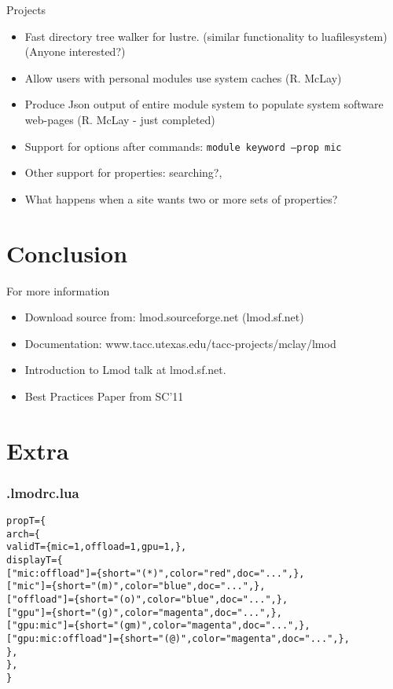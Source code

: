 \documentclass{beamer}
\begin{document}
\begin{frame}{Projects}
  \begin{itemize}
    \item Fast directory tree walker for lustre. (similar
      functionality to luafilesystem) (Anyone interested?)
    \item Allow users with personal modules use system caches (R. McLay)
    \item Produce Json output of entire module system to populate
      system software web-pages (R. McLay - just completed)
    \item Support for options after commands:  \texttt{module keyword --prop mic}
    \item Other support for properties: searching?,
    \item What happens when a site wants two or more sets of properties?
  \end{itemize}
\end{frame}





\section{Conclusion}

\begin{frame}{For more information}
  \begin{itemize}
    \item Download source from: lmod.sourceforge.net (lmod.sf.net)
    \item Documentation: www.tacc.utexas.edu/tacc-projects/mclay/lmod
    \item Introduction to Lmod talk at lmod.sf.net.
    \item Best Practices Paper from SC'11
  \end{itemize}
\end{frame}

\section{Extra}


\begin{frame}[fragile]
    \frametitle{.lmodrc.lua}
  {\tiny
    \begin{alltt}
propT = \{
   arch = \{
      validT = \{ mic = 1, offload = 1, gpu = 1, \},
      displayT = \{
         ["mic:offload"]     = \{ short = "(*)",  color = "red",     doc = "...",\},
         ["mic"]             = \{ short = "(m)",  color = "blue",    doc = "...",\},
         ["offload"]         = \{ short = "(o)",  color = "blue",    doc = "...",\},
         ["gpu"]             = \{ short = "(g)",  color = "magenta", doc = "...",\},
         ["gpu:mic"]         = \{ short = "(gm)", color = "magenta", doc = "...",\},
         ["gpu:mic:offload"] = \{ short = "(@)",  color = "magenta", doc = "...",\},
      \},
   \},
\}

    \end{alltt}
}
\end{frame}
\end{document}

